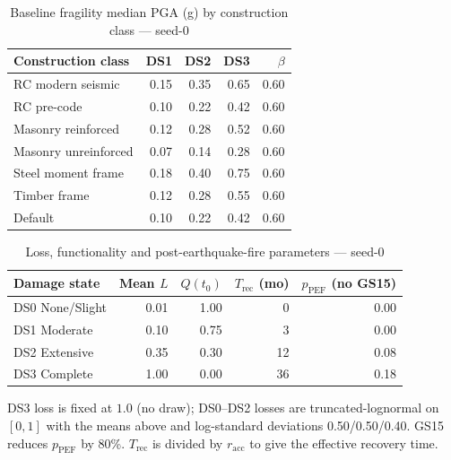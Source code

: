 \documentclass[11pt,a4paper]{article}
\begin{document}
\begin{table}[H]
  \centering
  \caption{Baseline fragility median PGA (g) by construction class --- seed-0}
  \begin{tabular}{lrrrr}
    \toprule
    \textbf{Construction class} & \textbf{DS1} & \textbf{DS2} & \textbf{DS3} &
    \textbf{$\beta$} \\
    \midrule
    RC modern seismic   & 0.15 & 0.35 & 0.65 & 0.60 \\
    RC pre-code         & 0.10 & 0.22 & 0.42 & 0.60 \\
    Masonry reinforced  & 0.12 & 0.28 & 0.52 & 0.60 \\
    Masonry unreinforced& 0.07 & 0.14 & 0.28 & 0.60 \\
    Steel moment frame  & 0.18 & 0.40 & 0.75 & 0.60 \\
    Timber frame        & 0.12 & 0.28 & 0.55 & 0.60 \\
    Default             & 0.10 & 0.22 & 0.42 & 0.60 \\
    \bottomrule
  \end{tabular}
\end{table}

\begin{table}[H]
  \centering
  \caption{Loss, functionality and post-earthquake-fire parameters --- seed-0}
  \begin{tabular}{lrrrr}
    \toprule
    \textbf{Damage state} & \textbf{Mean $L$} & \textbf{$Q(t_0)$} &
    \textbf{$T_{\text{rec}}$ (mo)} & \textbf{$p_{\text{PEF}}$ (no GS15)} \\
    \midrule
    DS0 None/Slight  & 0.01 & 1.00 & 0  & 0.00 \\
    DS1 Moderate     & 0.10 & 0.75 & 3  & 0.00 \\
    DS2 Extensive    & 0.35 & 0.30 & 12 & 0.08 \\
    DS3 Complete     & 1.00 & 0.00 & 36 & 0.18 \\
    \bottomrule
  \end{tabular}
\end{table}

DS3 loss is fixed at $1.0$ (no draw); DS0--DS2 losses are truncated-lognormal on
$[0,1]$ with the means above and log-standard deviations 0.50/0.50/0.40. GS15
reduces $p_{\text{PEF}}$ by 80\%. $T_{\text{rec}}$ is divided by
$r_{\text{acc}}$ to give the effective recovery time.
\end{document}
